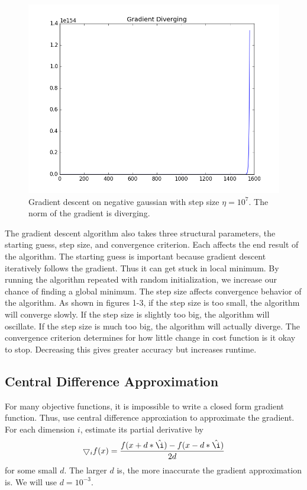 \documentclass[a4paper,twoside]{article}
\begin{document}
\begin{figure}[h]
  \includegraphics[width=\linewidth]{../Figures/P1/gradient_diverging.png}
  \caption{Gradient descent on negative gaussian with step size $\eta = 10^7$. The norm of the gradient is diverging.}
  \label{fig:gradient_converging}
\end{figure}

The gradient descent algorithm also takes three structural parameters, the starting guess, step size, and convergence criterion. Each affects the end result of the algorithm. The starting guess is important because gradient descent iteratively follows the gradient. Thus it can get stuck in local minimum. By running the algorithm repeated with random initialization, we increase our chance of finding a global minimum. The step size affects convergence behavior of the algorithm. As shown in figures 1-3, if the step size is too small, the algorithm will converge slowly. If the step size is slightly too big, the algorithm will oscillate. If the step size is much too big, the algorithm will actually diverge. The convergence criterion determines for how little change in cost function is it okay to stop. Decreasing this gives greater accuracy but increases runtime.

\subsection{Central Difference Approximation}

For many objective functions, it is impossible to write a closed form gradient function. Thus, use central difference approxiation to approximate the gradient. For each dimension $i$, estimate its partial derivative by 
\begin{equation}
\bigtriangledown_i f(x) = \frac{f(x+d*\hat{\i}) - f(x-d*\hat{\i})}{2d}
\end{equation}
for some small $d$. The larger $d$ is, the more inaccurate the gradient approximation is. We will use $d = 10^{-3}$.
\end{document}

